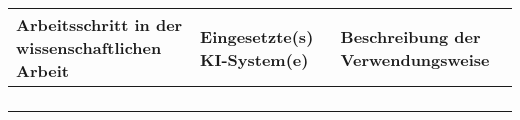 {\begin{tabular}{|p{4cm}|p{3cm}|p{7cm}|}
    \hline
    \textbf{Arbeitsschritt in der wissenschaftlichen Arbeit} &
%
%
%
    \textbf{Eingesetzte(s) KI-System(e)} & \textbf{Beschreibung der Verwendungsweise} \\
    \hline
    & & \\ %
    \hline
    & & \\ %
    \hline
    & & \\
    \hline
    & & \\
    \hline
  \end{tabular}
} %
